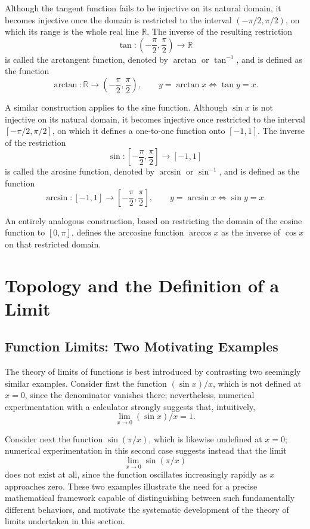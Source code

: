 Although the tangent function fails to be injective on its natural domain, it becomes injective once the domain is restricted to the interval $(-\pi/2, \pi/2)$, on which its range is the whole real line $\mathbb{R}$. The inverse of the resulting restriction
\[
\tan : \left( -\frac{\pi}{2}, \frac{\pi}{2} \right) \to \mathbb{R}
\]
 is called the arctangent function, denoted by $\arctan$ or $\tan^{-1}$, and is defined as the function
\[
\arctan : \mathbb{R} \to \left( -\frac{\pi}{2}, \frac{\pi}{2} \right), \qquad y = \arctan x \iff \tan y = x.
\]

A similar construction applies to the sine function. Although $\sin x$ is not injective on its natural domain, it becomes injective once restricted to the interval $[-\pi/2, \pi/2]$, on which it defines a one-to-one function onto $[-1, 1]$. The inverse of the restriction
\[
\sin : \left[ -\frac{\pi}{2}, \frac{\pi}{2} \right] \to [-1, 1]
\]
 is called the arcsine function, denoted by $\arcsin$ or $\sin^{-1}$, and is defined as the function
\[
\arcsin : [-1, 1] \to \left[ -\frac{\pi}{2}, \frac{\pi}{2} \right], \qquad y = \arcsin x \iff \sin y = x.
\]

An entirely analogous construction, based on restricting the domain of the cosine function to $[0, \pi]$, defines the arccosine function $\arccos x$ as the inverse of $\cos x$ on that restricted domain.

\section{Topology and the Definition of a Limit}

\subsection{Function Limits: Two Motivating Examples}

The theory of limits of functions is best introduced by contrasting two seemingly similar examples. Consider first the function $(\sin x)/x$, which is not defined at $x = 0$, since the denominator vanishes there; nevertheless, numerical experimentation with a calculator strongly suggests that, intuitively,
\[
\lim_{x \to 0} (\sin x)/x = 1.
\]

Consider next the function $\sin(\pi/x)$, which is likewise undefined at $x = 0$; numerical experimentation in this second case suggests instead that the limit \[
\lim_{x \to 0} \sin(\pi/x)
\] does not exist at all, since the function oscillates increasingly rapidly as $x$ approaches zero. These two examples illustrate the need for a precise mathematical framework capable of distinguishing between such fundamentally different behaviors, and motivate the systematic development of the theory of limits undertaken in this section.

